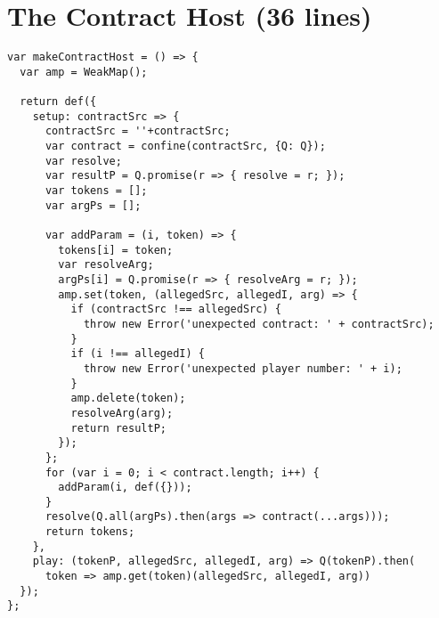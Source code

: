 \documentclass{llncs}
\begin{document}
\section{The Contract Host (36 lines)}

\begin{verbatim}
var makeContractHost = () => {
  var amp = WeakMap();

  return def({
    setup: contractSrc => {
      contractSrc = ''+contractSrc;
      var contract = confine(contractSrc, {Q: Q});
      var resolve;
      var resultP = Q.promise(r => { resolve = r; });
      var tokens = [];
      var argPs = [];

      var addParam = (i, token) => {
        tokens[i] = token;
        var resolveArg;
        argPs[i] = Q.promise(r => { resolveArg = r; });
        amp.set(token, (allegedSrc, allegedI, arg) => {
          if (contractSrc !== allegedSrc) {
            throw new Error('unexpected contract: ' + contractSrc);
          }
          if (i !== allegedI) {
            throw new Error('unexpected player number: ' + i);
          }
          amp.delete(token);
          resolveArg(arg);
          return resultP;
        });
      };
      for (var i = 0; i < contract.length; i++) {
        addParam(i, def({}));
      }
      resolve(Q.all(argPs).then(args => contract(...args)));
      return tokens;
    },
    play: (tokenP, allegedSrc, allegedI, arg) => Q(tokenP).then(
      token => amp.get(token)(allegedSrc, allegedI, arg))
  });
};
\end{verbatim}
\end{document}
